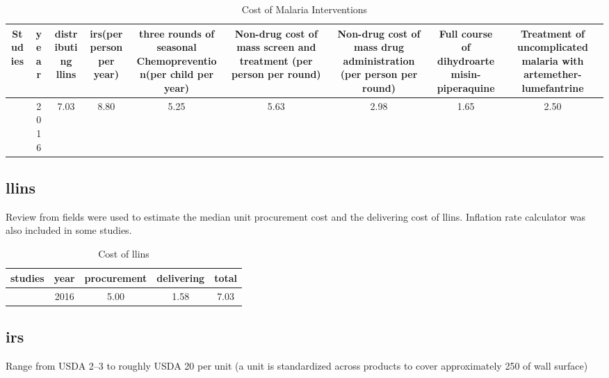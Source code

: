 \documentclass[a4paper, 12pt, twoside]{article}
\begin{document}
\begin{table}[htpb]
	\centering
	\caption{Cost of Malaria Interventions}
	\label{tab:cost_of_malaria_interventions}
	{\small
		\begin{tabular}{cSSSSSSSS}
			\toprule
			Studies           & {year} & {distributing \gls{llins}} & {\gls{irs}(per person per year)} & {three rounds of seasonal Chemoprevention(per child per year) } & {Non-drug cost of mass screen and treatment (per person per round)} & {Non-drug cost of mass drug administration (per person per round) } & {Full course of dihydroartemisin-piperaquine} & {Treatment of uncomplicated malaria with artemether-lumefantrine} \\
			\midrule
			\cite{Walker2016} & 2016   & 7.03                       & 8.80                             & 5.25                                                            & 5.63                                                                & 2.98                                                                & 1.65                                          & 2.50                                                              \\
			\bottomrule
		\end{tabular}
	}
\end{table}

\subsection{\texorpdfstring{\gls{llins}}{LLINs}}
Review from fields were used to estimate the median unit procurement cost and the delivering cost of \gls{llins}.
Inflation rate calculator was also included in some studies\cite{Walker2016}.

\begin{table}[htpb]
	\centering
	\caption{Cost of \gls{llins}}
	\label{tab:cost_of_llins}
	\begin{tabular}{cSSSS}
		\toprule
		studies           & {year} & {procurement} & {delivering} & {total} \\
		\midrule
		\cite{Walker2016} & 2016   & 5.00          & 1.58         & 7.03    \\
		\bottomrule
	\end{tabular}
\end{table}

\subsection{\texorpdfstring{\gls{irs}}{IRS}}
Range from USDA 2–3 to roughly USDA 20 per unit\cite{Oxborough2016}
(a unit is standardized across products to cover approximately 250 of wall surface)
\end{document}
